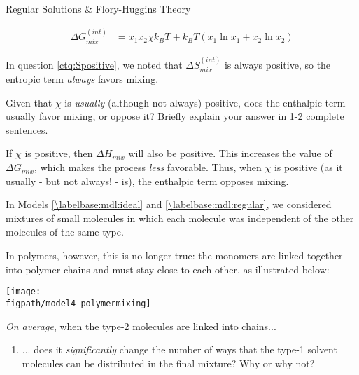 \begin{activity}{Regular Solutions \& Flory-Huggins Theory}
\begin{ctqs}
\begin{enumerate}
			\begin{solution}[1in]{}
				\begin{align*}
					\Delta G_{mix}^{(int)} &= x_1 x_2 \chi k_B T + k_B T(x_1 \ln x_1 + x_2 \ln x_2)
				\end{align*}
			\end{solution}
		\end{enumerate}
			
		\question In question \ref{ctq:Spositive}, we noted that $\Delta S_{mix}^{(int)}$ is always positive, so the entropic term \emph{always} favors mixing.
		
			Given that $\chi$ is \emph{usually} (although not always) positive, does the enthalpic term usually favor mixing, or oppose it?  Briefly explain your answer in 1-2 complete sentences.
			
			\begin{solution}[2.5in]{}
			
				If $\chi$ is positive, then $\Delta H_{mix}$ will also be positive.  This increases the value of $\Delta G_{mix}$, which makes the process \emph{less} favorable.    Thus, when $\chi$ is positive (as it usually - but not always! - is), the enthalpic term opposes mixing.
				
			\end{solution}
\end{ctqs}

\begin{model}
\label{\labelbase:mdl:floryhuggins}

In Models \ref{\labelbase:mdl:ideal} and \ref{\labelbase:mdl:regular}, we considered mixtures of small molecules in which each molecule  was independent of the other molecules of the same type.

In polymers, however, this is no longer true: the monomers are linked together into polymer chains and must stay close to each other, as illustrated below: 
	
	\centerline{\texttt{[image: \\figpath/model4-polymermixing]}}

\end{model}

\begin{ctqs}

	\question \emph{On average}, when the type-2 molecules are linked into chains...
	
		\begin{enumerate}
			\item ... does it \emph{significantly} change the number of ways that the type-1 solvent molecules can be distributed in the final mixture?  Why or why not?
				\label{\labelbase:ctq:FHtype1}
			

\end{enumerate}
\end{ctqs}
\end{activity}
